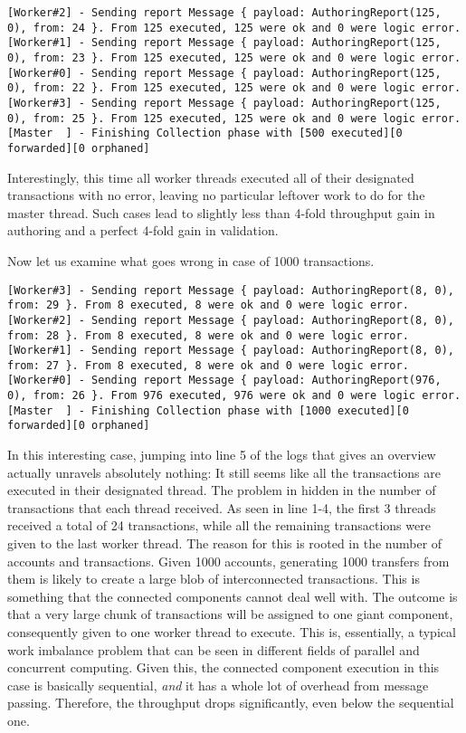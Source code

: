 \begin{itemize}
	\begin{lstlisting}
[Worker#2] - Sending report Message { payload: AuthoringReport(125, 0), from: 24 }. From 125 executed, 125 were ok and 0 were logic error.
[Worker#1] - Sending report Message { payload: AuthoringReport(125, 0), from: 23 }. From 125 executed, 125 were ok and 0 were logic error.
[Worker#0] - Sending report Message { payload: AuthoringReport(125, 0), from: 22 }. From 125 executed, 125 were ok and 0 were logic error.
[Worker#3] - Sending report Message { payload: AuthoringReport(125, 0), from: 25 }. From 125 executed, 125 were ok and 0 were logic error.
[Master  ] - Finishing Collection phase with [500 executed][0 forwarded][0 orphaned]
	\end{lstlisting}

	Interestingly, this time all worker threads executed all of their designated transactions with
	no error, leaving no particular leftover work to do for the master thread. Such cases lead to
	slightly less than 4-fold throughput gain in authoring and a perfect 4-fold gain in validation.

	Now let us examine what goes wrong in case of 1000 transactions.

	\begin{lstlisting}
[Worker#3] - Sending report Message { payload: AuthoringReport(8, 0), from: 29 }. From 8 executed, 8 were ok and 0 were logic error.
[Worker#2] - Sending report Message { payload: AuthoringReport(8, 0), from: 28 }. From 8 executed, 8 were ok and 0 were logic error.
[Worker#1] - Sending report Message { payload: AuthoringReport(8, 0), from: 27 }. From 8 executed, 8 were ok and 0 were logic error.
[Worker#0] - Sending report Message { payload: AuthoringReport(976, 0), from: 26 }. From 976 executed, 976 were ok and 0 were logic error.
[Master  ] - Finishing Collection phase with [1000 executed][0 forwarded][0 orphaned]
	\end{lstlisting}

	In this interesting case, jumping into line 5 of the logs that gives an overview actually
	unravels absolutely nothing: It still seems like all the transactions are executed in their
	designated thread. The problem in hidden in the number of transactions that each thread
	received. As seen in line 1-4, the first 3 threads received a total of 24 transactions, while
	all the remaining transactions were given to the last worker thread. The reason for this is
	rooted in the number of accounts and transactions. Given 1000 accounts, generating 1000
	transfers from them is likely to create a large blob of interconnected transactions. This is
	something that the connected components cannot deal well with. The outcome is that a very large
	chunk of transactions will be assigned to one giant component, consequently given to one worker
	thread to execute. This is, essentially, a typical work imbalance problem that can be seen in
	different fields of parallel and concurrent computing. Given this, the connected component
	execution in this case is basically sequential, \textit{and} it has a whole lot of overhead from
	message passing. Therefore, the throughput drops significantly, even below the sequential one.


\end{itemize}
